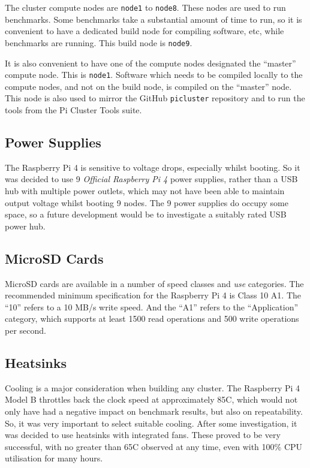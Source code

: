 The cluster compute nodes are \verb|node1| to \verb|node8|. These nodes are used to run benchmarks. Some benchmarks take a substantial amount of time to run, so it is convenient to have a dedicated build node for compiling software, etc, while benchmarks are running. This build node is \verb|node9|.

It is also convenient to have one of the compute nodes designated the ``master'' compute node. This is \verb|node1|. Software which needs to be compiled locally to the compute nodes, and not on the build node, is compiled on the ``master'' node. This node is also used to mirror the GitHub \verb|picluster| repository and to run the tools from the Pi Cluster Tools suite. 


%
%
\subsection{Power Supplies}
The Raspberry Pi 4 is sensitive to voltage drops, especially whilst booting. So it was decided to use 9 \emph{Official Raspberry Pi 4} power supplies, rather than a USB hub with multiple power outlets, which may not have been able to maintain output voltage whilst booting 9 nodes. The 9 power supplies do occupy some space, so a future development would be to investigate a suitably rated USB power hub.


%
%
\subsection{MicroSD Cards}
MicroSD cards are available in a number of speed classes and \emph{use} categories. The recommended minimum specification for the Raspberry Pi 4 is Class 10 A1. The ``10'' refers to a 10 MB/s write speed. And the ``A1'' refers to the ``Application'' category, which supports at least 1500 read operations and 500 write operations per second.


%
%
\subsection{Heatsinks}
Cooling is a major consideration when building any cluster. The Raspberry Pi 4 Model B throttles back the clock speed at approximately 85\degree C, which would not only have had a negative impact on benchmark results, but also on repeatability. So, it was very important to select suitable cooling. After some investigation, it was decided to use heatsinks with integrated fans. These proved to be very successful, with no greater than 65\degree C observed at any time, even with 100\% CPU utilisation for many hours. 


